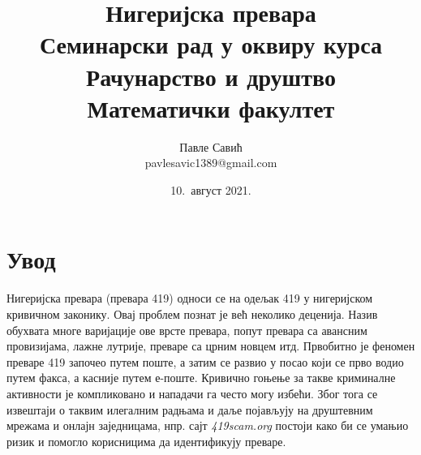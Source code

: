 \documentclass[a4paper]{article}
\begin{document}
\title{Нигеријска превара\\ \small{Семинарски рад у оквиру курса\\Рачунарство и друштво\\ Математички факултет}}

\author{Павле Савић\\ pavlesavic1389@gmail.com}
\date{10.~август 2021.}
\maketitle


\tableofcontents

\newpage

\section{Увод}
\label{sec:uvod}
Нигеријска превара \cite{def} (превара 419) односи се на одељак 419 у нигеријском кривичном законику. Овај проблем познат је већ неколико деценија. Назив обухвата многе варијације ове врсте превара, попут превара са авансним провизијама, лажне лутрије, преваре са црним новцем итд. Првобитно је феномен преваре 419 започео путем поште, а затим се развио у посао који се прво водио путем факса, а касније путем е-поште. Кривично гоњење за такве криминалне активности је компликовано \cite{prosecuting} и нападачи га често могу избећи. Због тога се извештаји о таквим илегалним радњама и даље појављују на друштевним мрежама и онлајн заједницама, нпр. сајт \emph{419scam.org} \cite{org} постоји како би се умањио ризик и помогло корисницима да идентификују преваре.
\end{document}
